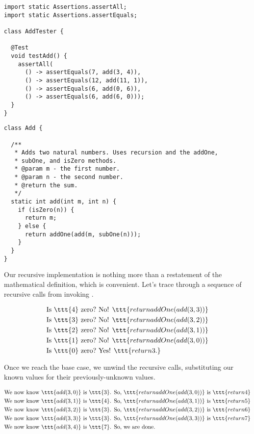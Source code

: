 \begin{lstlisting}[language=MyJava]
import static Assertions.assertAll;
import static Assertions.assertEquals;

class AddTester {
  
  @Test
  void testAdd() {
    assertAll(
      () -> assertEquals(7, add(3, 4)),
      () -> assertEquals(12, add(11, 1)),
      () -> assertEquals(6, add(0, 6)),
      () -> assertEquals(6, add(6, 0)));
  }
}
\end{lstlisting}

\begin{lstlisting}[language=MyJava]
class Add {

  /**
   * Adds two natural numbers. Uses recursion and the addOne, 
   * subOne, and isZero methods.
   * @param m - the first number.
   * @param n - the second number.
   * @return the sum.
   */
  static int add(int m, int n) {
    if (isZero(n)) { 
      return m;
    } else {
      return addOne(add(m, subOne(n)));
    }
  }
}
\end{lstlisting}

Our recursive implementation is nothing more than a restatement of the mathematical definition, which is convenient. 
Let's trace through a sequence of recursive calls from invoking .

\begin{align*}
    \text{Is }\ttt{4} \text{ zero?} &\text{ No! }\ttt{return addOne(add(3, 3))}\\
    \text{Is }\ttt{3} \text{ zero?} &\text{ No! }\ttt{return addOne(add(3, 2))}\\
    \text{Is }\ttt{2} \text{ zero?} &\text{ No! }\ttt{return addOne(add(3, 1))}\\
    \text{Is }\ttt{1} \text{ zero?} &\text{ No! }\ttt{return addOne(add(3, 0))}\\
    \text{Is }\ttt{0} \text{ zero?} &\text{ Yes! }\ttt{return 3.}
\end{align*}

Once we reach the base case, we unwind the recursive calls, substituting our known values for their previously-unknown values.

\begin{align*}
    \text{We now know }\ttt{add(3, 0)} \text{ is }\ttt{3}\text{. So, } &\ttt{return addOne(add(3, 0))} \text{ is } \ttt{return 4}\\
    \text{We now know }\ttt{add(3, 1)} \text{ is }\ttt{4}\text{. So, } &\ttt{return addOne(add(3, 1))} \text{ is } \ttt{return 5}\\
    \text{We now know }\ttt{add(3, 2)} \text{ is }\ttt{3}\text{. So, } &\ttt{return addOne(add(3, 2))} \text{ is } \ttt{return 6}\\
    \text{We now know }\ttt{add(3, 3)} \text{ is }\ttt{3}\text{. So, } &\ttt{return addOne(add(3, 3))} \text{ is } \ttt{return 7}\\
    \text{We now know }\ttt{add(3, 4)} \text{ is }\ttt{7}\text{. So, } &\text{we are done.} 
\end{align*}


